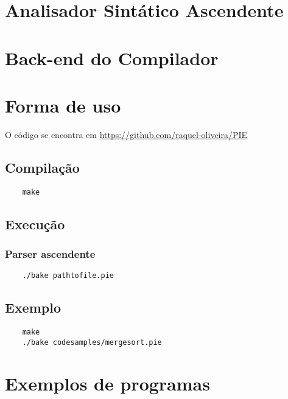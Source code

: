 \documentclass[12pt]{report}
\begin{document}
\newpage
\chapter{Analisador Sintático Ascendente}


\newpage
\chapter{Back-end do Compilador}


\newpage
\chapter{Forma de uso}\label{ch:uso}
O código se encontra em \url{https://github.com/raquel-oliveira/PIE}
\section{Compilação}
\begin{verbatim}
    make
\end{verbatim}

\section{Execução}
\subsection{Parser ascendente}
\begin{verbatim}
    ./bake pathtofile.pie
\end{verbatim}

\section{Exemplo}
\begin{verbatim}
    make
    ./bake codesamples/mergesort.pie
\end{verbatim}

\newpage
\chapter{Exemplos de programas}


\newpage
\end{document}
